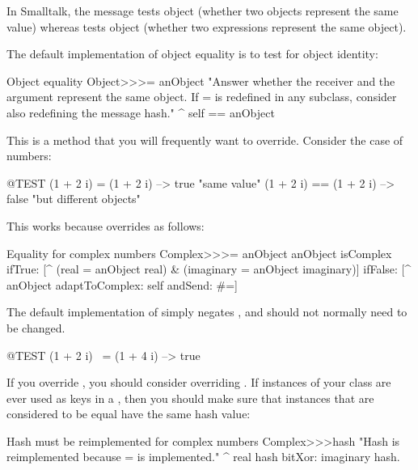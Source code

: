 \documentclass[a4paper,10pt,twoside]{book}
\begin{document}
In Smalltalk, the message \ct{=} tests object  (\ie whether two objects represent the same value) whereas \ct{==} tests object  (\ie whether two expressions represent the same object).

The default implementation of object equality is to test for object identity:
\begin{method}{Object equality}
Object>>>= anObject
    "Answer whether the receiver and the argument represent the same object.
    If = is redefined in any subclass, consider also redefining the message hash."
    ^ self == anObject
\end{method}

This is a method that you will frequently want to override. Consider the case of  numbers:

\begin{code}{@TEST}
(1 + 2 i) = (1 + 2 i)   --> true     "same value"
(1 + 2 i) == (1 + 2 i) --> false    "but different objects"
\end{code}

This works because  overrides \ct{=} as follows:
\begin{method}{Equality for complex numbers}
Complex>>>= anObject
    anObject isComplex
        ifTrue: [^ (real = anObject real) & (imaginary = anObject imaginary)]
        ifFalse: [^ anObject adaptToComplex: self andSend: #=]
\end{method}

The default implementation of  simply negates , and should not normally need to be changed.

\begin{code}{@TEST}
(1 + 2 i) ~= (1 + 4 i) --> true
\end{code}

If you override \ct{=}, you should consider overriding . If instances of your class are ever used as keys in a , then you should make sure that instances that are considered to be equal have the same hash value:
\begin{method}{Hash must be reimplemented for complex numbers}
Complex>>>hash
    "Hash is reimplemented because = is implemented."
    ^ real hash bitXor: imaginary hash.
\end{method}
\end{document}
